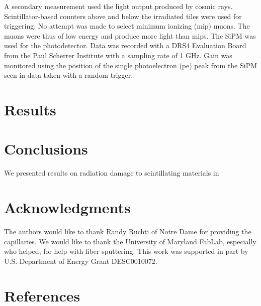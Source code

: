 \documentclass[review]{elsarticle}
\begin{document}
A secondary measurement used the
light output produced by cosmic rays.
Scintillator-based counters above and below the irradiated tiles were used for triggering.
No attempt was made to select minimum ionizing (mip) muons.  The muons were thus
of low energy and produce more light than mips.
The SiPM was used for the photodetector.  Data was recorded with a
DRS4 Evaluation Board from the Paul Scherrer Institute with a sampling
rate of 1 GHz.  Gain was monitored using the position of the single
photoelectron (pe) peak from the SiPM seen in data taken with a random trigger.

\section{Results}
\label{sec:Results}


\section{Conclusions}
\label{sec:Conclusions}

We presented results on radiation damage to scintillating materials
in 


\section{Acknowledgments}
The authors would like to thank Randy Ruchti of Notre Dame for
providing the capillaries.
 We would like to thank the University of Maryland
FabLab, especially {\color{red} who helped}, for help with fiber sputtering.
This work was supported in part by U.S. Department of Energy
Grant DESC0010072.

\section*{References}


\end{document}
